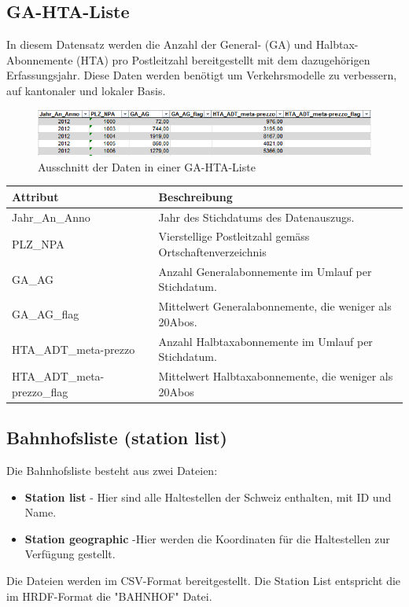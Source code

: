 \documentclass[a4paper,12pt]{scrartcl}
\begin{document}
\subsection{GA-HTA-Liste}
\label{GA-HTA-Liste}
In diesem Datensatz werden die Anzahl der General- (GA) und Halbtax-Abonnemente (HTA) pro Postleitzahl bereitgestellt mit dem dazugehörigen Erfassungsjahr. Diese Daten werden benötigt um Verkehrsmodelle zu verbessern, auf kantonaler und lokaler Basis.

\begin{figure}[]
	\centering
	\includegraphics[width=12cm]{img/bspGA-HTA-Liste.png}
	\caption{Ausschnitt der Daten in einer GA-HTA-Liste  \cite{gahtaliste}}
	\label{fig:Beispiel GA-HTA-Liste}
\end{figure}
\begin{tabular}{|l|l|}  \hline
	Attribut & Beschreibung \\ \hline
	Jahr\_An\_Anno & Jahr des Stichdatums des Datenauszugs.  \\ \hline
	PLZ\_NPA & Vierstellige Postleitzahl gemäss Ortschaftenverzeichnis \\ \hline
	GA\_AG & Anzahl Generalabonnemente im Umlauf per Stichdatum. \\ \hline
	GA\_AG\_flag & Mittelwert Generalabonnemente, die weniger als 20Abos. \\ \hline
	HTA\_ADT\_meta-prezzo & Anzahl Halbtaxabonnemente im Umlauf per Stichdatum. \\ \hline	
	HTA\_ADT\_meta-prezzo\_flag & Mittelwert Halbtaxabonnemente, die weniger als 20Abos \\ \hline
\end{tabular}


\subsection{Bahnhofsliste (station list)}
\label{Bahnhofsliste}
Die Bahnhofsliste besteht aus zwei Dateien:
\begin{itemize}
	\item{\textbf{Station list}} - Hier sind alle Haltestellen der Schweiz enthalten, mit ID und Name.   
	\item{\textbf{Station geographic}} -Hier werden die Koordinaten für die Haltestellen zur Verfügung gestellt.
\end{itemize}
Die Dateien werden im CSV-Format bereitgestellt.
Die Station List entspricht die im HRDF-Format die "BAHNHOF"  Datei.\cite{bahnhofsliste}
\end{document}
